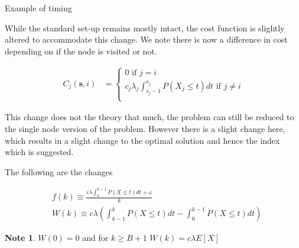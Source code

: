 \documentclass[a4paper,10pt]{article}
\theoremstyle{definition}
\theoremstyle{definition}
\theoremstyle{remark}
\theoremstyle{definition}
\newtheorem*{note}{Note}
\begin{document}
\begin{myfigure}
\begin{center}
\end{center}
\caption{Example of timing}
\end{myfigure} 

While the standard set-up remains mostly intact, the cost function is slightly altered to accommodate this change. We note there is now a difference in cost depending on if the node is visited or not.

\begin{align*}
C_{j}(\bm{s},i) &= \begin{cases}
0  \text{ if } j=i \\
c_{j} \lambda_{j} \int_{s_{j}-1}^{s_{j}} P(X_{j} \leq t) dt \text{ if } j \neq i \\
\end{cases}
\end{align*}

This change does not the theory that much, the problem can still be reduced to the single node version of the problem. However there is a slight change here, which results in a slight change to the optimal solution and hence the index which is suggested.

The following are the changes

\begin{align*}
&f(k) \equiv \frac{c \lambda \int_{0}^{k-1} P(X \leq t) dt + \omega}{k} \\
&W(k) \equiv c \lambda \left( \int_{k-1}^{k} P(X \leq t) dt - \int_{0}^{k-1} P(X \leq t) dt \right)
\end{align*}

\begin{note}
$W(0)=0$ and for $k \geq B+1$ $W(k)= c \lambda E[X]$
\end{note}
\end{document}

